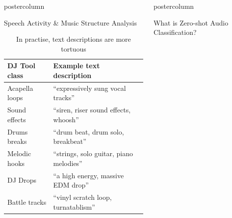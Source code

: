\documentclass{beamer}
\newlength{\columnheight}
\begin{document}
\begin{frame}
\begin{columns}
\begin{column}{.43\textwidth}
\begin{beamercolorbox}[center]{postercolumn}
\begin{minipage}{.98\textwidth}
{\begin{myblock}{Speech Activity \& Music Structure Analysis}
%
			\begin{table}
			 \begin{center}
			 \begin{tabular}{ll}
			  \midrule
			  \textbf{DJ Tool class} & \textbf{Example text description} \\
			  \midrule
				Acapella loops & ``expressively sung vocal tracks''  \\
				Sound effects &  ``siren, riser sound effects, whoosh''\\
				Drums breaks  & ``drum beat, drum solo, breakbeat''  \\
				Melodic hooks & ``strings, solo guitar, piano melodies''  \\
				DJ Drops & ``a high energy, massive EDM drop''  \\
				Battle tracks & ``vinyl scratch loop, turnatablism''   \\
			 \end{tabular}
			\end{center}
			 \caption{In practise, text descriptions are more tortuous}
			 \label{tab:djtool_texts}
			\end{table}


					\end{myblock}\vfill
		}\end{minipage}\end{beamercolorbox}
	\end{column}
	
	
	
	\begin{column}{.57\textwidth}
		\begin{beamercolorbox}[center]{postercolumn}
			\begin{minipage}{.98\textwidth} %
				\parbox[t][\columnheight]{\textwidth}{ %
					\begin{myblock}{What is Zero-shot Audio Classification?}
						

\end{myblock}}
\end{minipage}
\end{beamercolorbox}
\end{column}
\end{columns}
\end{frame}
\end{document}
